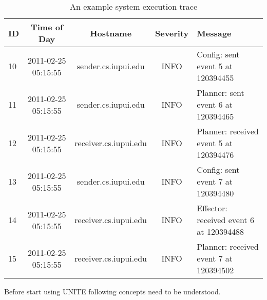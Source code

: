 \begin{table}[h, captionpos=b]
  \caption{An example system execution trace }
  \label{table:execution-trace}
  \begin{tabular}{lcccl}
  \hline
  \textbf{ID} & \textbf{Time of Day} & \textbf{Hostname} & \textbf{Severity} & \textbf{Message} \\
  \hline
  10 & 2011-02-25 05:15:55 & sender.cs.iupui.edu & INFO & Config: sent event 5 at 120394455 \\
  11 & 2011-02-25 05:15:55 & sender.cs.iupui.edu & INFO & Planner: sent event 6 at 120394465 \\
  12 & 2011-02-25 05:15:55 & receiver.cs.iupui.edu & INFO & Planner: received event 5 at 120394476 \\
  13 & 2011-02-25 05:15:55 & sender.cs.iupui.edu & INFO & Config: sent event 7 at 120394480 \\
  14 & 2011-02-25 05:15:55 & receiver.cs.iupui.edu & INFO & Effector: received event 6 at 120394488 \\
  15 & 2011-02-25 05:15:55 & receiver.cs.iupui.edu & INFO & Planner: received event 7 at 120394502 \\
  \end{tabular}
\end{table}


Before start using UNITE following concepts need to be understood.

